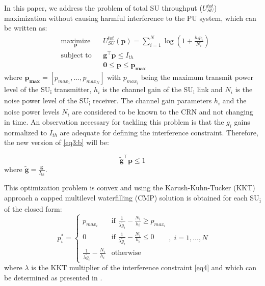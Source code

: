 \documentclass[journal]{IEEEtran}
\begin{document}
In this paper, we address the problem of total SU throughput ($U_{SU}^{tot}$) maximization without causing harmful interference to the PU system, which can be written as:
\begin{subequations}
 \label{eq3:optim}
 \begin{align}
 & \underset{\mathbf{p}}{\text{maximize}}
 & & U_{SU}^{tot}(\mathbf{p})=\sum\limits_{i=1}^{N}\log\left(1+\frac{h_{i}p_{i}}{N_{i}}\right) \label{eq3:a} \\
 & \text{subject to}
 & & \mathbf{g^\intercal}\mathbf{p} \leq I_{th} \label{eq3:b} \\
 &
 & & \mathbf{0} \leq \mathbf{p} \leq \mathbf{p_{max}} \label{eq3:c}
 \end{align}
\end{subequations}
where $\mathbf{p_{max}}=[p_{max_{1}},...,p_{max_{N}}]$ with $p_{max_{i}}$ being the maximum transmit power level of the SU\textsubscript{i} transmitter, $h_{i}$ is the channel gain of the SU\textsubscript{i} link and $N_{i}$ is the noise power level of the SU\textsubscript{i} receiver. The channel gain parameters $h_{i}$ and the noise power levels $N_{i}$ are considered to be known to the CRN and not changing in time. An observation necessary for tackling this problem is that the $g_{i}$ gains normalized to $I_{th}$ are adequate for defining the interference constraint. Therefore, the new version of \eqref{eq3:b} will be:

\begin{equation}
\mathbf{\tilde{g}^\intercal}\mathbf{p} \leq 1
\label{eq4}
\end{equation}
where $\mathbf{\tilde{g}}=\frac{\mathbf{g}}{I_{th}}$.

This optimization problem is convex and using the Karush-Kuhn-Tucker (KKT) approach a capped multilevel waterfilling (CMP) solution is obtained \cite{biban70} for each SU\textsubscript{i} of the closed form:
\begin{equation}
p^{*}_{i}=\left\{
  \begin{array}{cc}
   p_{max_{i}} & \mbox{if $\frac{1}{\lambda \tilde{g}_{i}}-\frac{N_{i}}{h_{i}} \geq p_{max_{i}}$}\\
   0 & \mbox{if $\frac{1}{\lambda \tilde{g}_{i}}-\frac{N_{i}}{h_{i}} \leq 0$}\\
   \frac{1}{\lambda \tilde{g}_{i}}-\frac{N_{i}}{h_{i}} & \mbox{otherwise}
  \end{array}, \; i = 1, \ldots, N
  \right.
\label{eq5}
\end{equation}
where $\lambda$ is the KKT multiplier of the interference constraint \eqref{eq4} and which can be determined as presented in \cite{biban70}.
\end{document}
